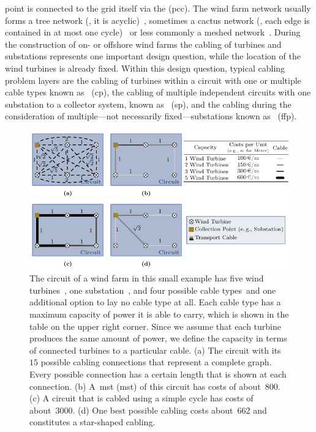 point is connected to the grid itself via the \emph{}
(\gls{pcc}). The wind farm network usually forms a tree network (\ie, it is
acyclic)~\cite{online:bard-offshore-1}, sometimes a cactus network (\ie, each
edge is contained in at most one cycle)~\cite{online:trianel-windpark-borkum-1}
or less commonly a meshed network~\cite{online:global-tech-1}. During the
construction of on- or offshore wind farms the cabling of turbines and
substations represents one important design question, while the location of the
wind turbines is already fixed. Within this design question, typical cabling
problem layers are the cabling of turbines within a circuit with one or multiple
cable types known as~\emph{} (\gls{cp}), the cabling of multiple
independent circuits with one substation to a collector system, known
as~\emph{} (\gls{sp}), and the cabling during the consideration
of multiple---not necessarily fixed---substations known
as~\emph{} (\gls{ffp}).
% 
\begin{figure}[t!]
    \includegraphics[page=1,scale=1]
    {windfarmplacement/figures/wind-farm-minimal-example.pdf}
    \caption[A circuit cabling example showing different cabling.]{The circuit
    of a wind farm in this small example has five wind turbines~\tikzTurbine,
    one substation~\tikzSubstation, and four possible cable
    types~\tikzTransportCable and one additional option to lay no cable type
    at all. Each cable type has a maximum capacity of power it is able to carry,
    which is shown in the table on the upper right corner. Since we assume that
    each turbine produces the same amount of power, we define the capacity in
    terms of connected turbines to a particular cable. (a) The circuit with
    its~$15$ possible cabling connections that represent a complete graph. Every
    possible connection has a certain length that is shown at each connection.
    (b) A~\acrlong{mst} (\gls{mst}) of this circuit has costs of
    about~\SI{800}{\EUR}. (c) A circuit that is cabled using a simple cycle has
    costs of about~\SI{3000}{\EUR}. (d) One best possible cabling costs
    about~\SI{662}{\EUR} and constitutes a star-shaped cabling.}
    \label{ch:wfcp:fig:wind-farm-minimal-example}
\end{figure}
